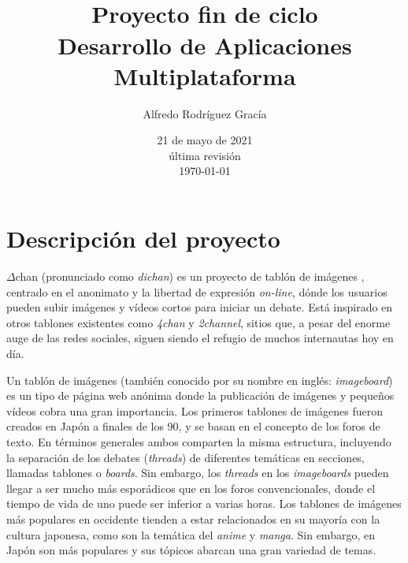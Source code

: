 \documentclass[12pt,a4paper,titlepage]{article}
\title{\projectname\\\bigskip\normalsize{Proyecto fin de ciclo\\Desarrollo de Aplicaciones Multiplataforma}}
\author{Alfredo Rodríguez Gracía}
\date{21 de mayo de 2021\\\bigskip\scriptsize{última revisión\\\today}}
\newcommand\projectname{$\Delta$chan}
\begin{document}
    \maketitle
    \tableofcontents
    \newpage

    \section{Descripción del proyecto}



    {\projectname} (pronunciado como \textit{dichan}) es un proyecto de tablón de imágenes \cite{wiki:imageboard}, centrado en el anonimato y la libertad de expresión \textit{on-line}, dónde los usuarios pueden subir imágenes y vídeos cortos para iniciar un debate. Está inspirado en otros tablones existentes como \emph{4chan} y \emph{2channel}, sitios que, a pesar del enorme auge de las redes sociales, siguen siendo el refugio de muchos internautas hoy en día.

    Un tablón de imágenes (también conocido por su nombre en inglés: \textit{imageboard}) es un tipo de página web anónima donde la publicación de imágenes y pequeños vídeos cobra una gran importancia. Los primeros tablones de imágenes fueron creados en Japón a finales de los 90, y se basan en el concepto de los foros de texto. En términos generales ambos comparten la misma estructura, incluyendo la separación de los debates (\textit{threads}) de diferentes temáticas en secciones, llamadas tablones o \textit{boards}. Sin embargo, los \textit{threads} en los \textit{imageboards} pueden llegar a ser mucho más esporádicos que en los foros convencionales, donde el tiempo de vida de uno puede ser inferior a varias horas. Los tablones de imágenes más populares en occidente tienden a estar relacionados en su mayoría con la cultura japonesa, como son la temática del \emph{anime} y \emph{manga}. Sin embargo, en Japón son más populares y sus tópicos abarcan una gran variedad de temas.
\end{document}
